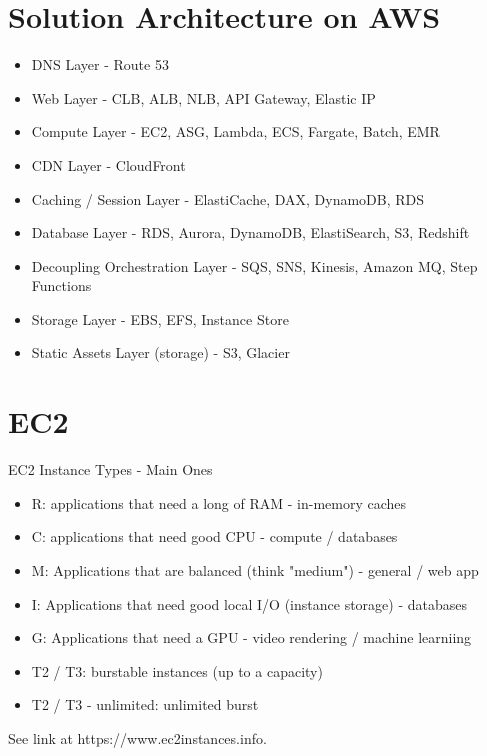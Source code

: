 \section{Solution Architecture on AWS}

\begin{itemize}
    \item DNS Layer - Route 53
    \item Web Layer - CLB, ALB, NLB, API Gateway, Elastic IP
    \item Compute Layer - EC2, ASG, Lambda, ECS, Fargate, Batch, EMR
    \item CDN Layer - CloudFront
    \item Caching / Session Layer - ElastiCache, DAX, DynamoDB, RDS
    \item Database Layer - RDS, Aurora, DynamoDB, ElastiSearch, S3, Redshift
    \item Decoupling Orchestration Layer - SQS, SNS, Kinesis, Amazon MQ, Step Functions
    \item Storage Layer - EBS, EFS, Instance Store
    \item Static Assets Layer (storage) - S3, Glacier
\end{itemize}


\section{EC2}
EC2 Instance Types - Main Ones
\begin{itemize}
    \item R: applications that need a long of RAM - in-memory caches
    \item C: applications that need good CPU - compute / databases
    \item M: Applications that are balanced (think "medium") - general / web app
    \item I: Applications that need good local I/O (instance storage) - databases
    \item G: Applications that need a GPU - video rendering / machine learniing
    \item T2 / T3: burstable instances (up to a capacity)
    \item T2 / T3 - unlimited: unlimited burst
\end{itemize}

See link at https://www.ec2instances.info.

